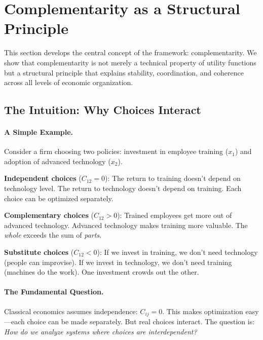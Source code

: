 \documentclass[12pt,a4paper]{article}
\begin{document}
\section{Complementarity as a Structural Principle}
\label{sec:complementarity}

This section develops the central concept of the framework: complementarity.
We show that complementarity is not merely a technical property of utility functions
but a structural principle that explains stability, coordination, and coherence
across all levels of economic organization.

\subsection{The Intuition: Why Choices Interact}

\paragraph{A Simple Example.}
Consider a firm choosing two policies: investment in employee training ($x_1$)
and adoption of advanced technology ($x_2$).

\textbf{Independent choices} ($C_{12} = 0$):
The return to training doesn't depend on technology level.
The return to technology doesn't depend on training.
Each choice can be optimized separately.

\textbf{Complementary choices} ($C_{12} > 0$):
Trained employees get more out of advanced technology.
Advanced technology makes training more valuable.
The \emph{whole} exceeds the sum of \emph{parts}.

\textbf{Substitute choices} ($C_{12} < 0$):
If we invest in training, we don't need technology (people can improvise).
If we invest in technology, we don't need training (machines do the work).
One investment crowds out the other.

\paragraph{The Fundamental Question.}
Classical economics assumes independence: $C_{ij} = 0$.
This makes optimization easy---each choice can be made separately.
But real choices interact. The question is:
\emph{How do we analyze systems where choices are interdependent?}
\end{document}
